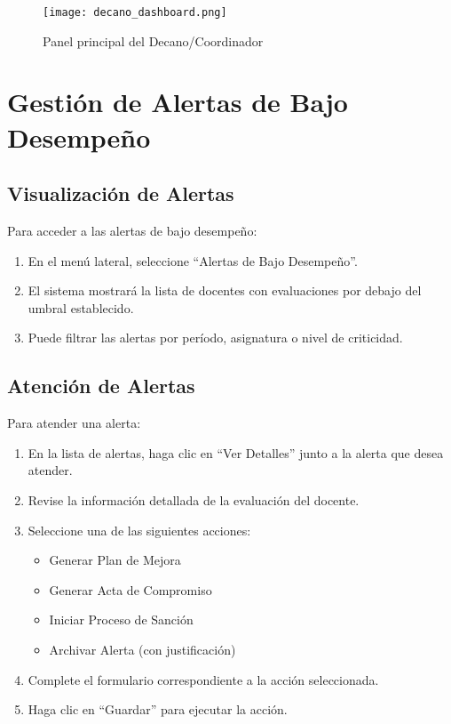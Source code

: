 \documentclass[12pt,a4paper]{book}
\begin{document}
\begin{figure}[H]
    \centering
    \texttt{[image: decano\_dashboard.png]}
    \caption{Panel principal del Decano/Coordinador}
    \label{fig:decano_dashboard}
\end{figure}

\section{Gestión de Alertas de Bajo Desempeño}
\subsection{Visualización de Alertas}
Para acceder a las alertas de bajo desempeño:

\begin{enumerate}
    \item En el menú lateral, seleccione ``Alertas de Bajo Desempeño''.
    \item El sistema mostrará la lista de docentes con evaluaciones por debajo del umbral establecido.
    \item Puede filtrar las alertas por período, asignatura o nivel de criticidad.
\end{enumerate}

\subsection{Atención de Alertas}
Para atender una alerta:

\begin{enumerate}
    \item En la lista de alertas, haga clic en ``Ver Detalles'' junto a la alerta que desea atender.
    \item Revise la información detallada de la evaluación del docente.
    \item Seleccione una de las siguientes acciones:
    \begin{itemize}
        \item Generar Plan de Mejora
        \item Generar Acta de Compromiso
        \item Iniciar Proceso de Sanción
        \item Archivar Alerta (con justificación)
    \end{itemize}
    \item Complete el formulario correspondiente a la acción seleccionada.
    \item Haga clic en ``Guardar'' para ejecutar la acción.
\end{enumerate}
\end{document}
